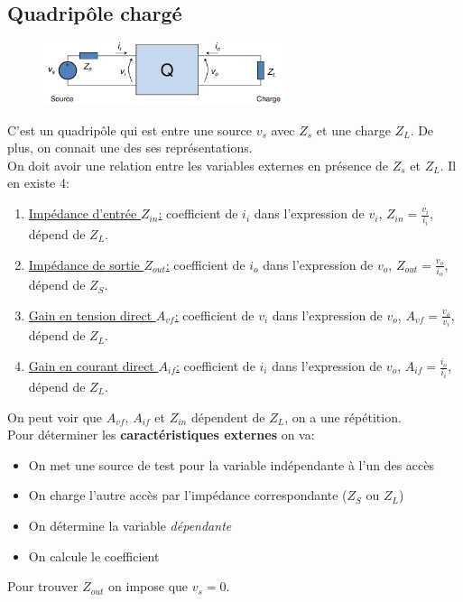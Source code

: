 \documentclass{report}
\begin{document}
\subsection{Quadripôle chargé}
\begin{figure}[H]
\centering
\includegraphics[width=7cm]{img/quadriCharge.png}
\end{figure}
C'est un quadripôle qui est entre une source $v_s$ avec $Z_s$ et une charge $Z_L$. De plus, on connait une des ses représentations.\\
On doit avoir une relation entre les variables externes en présence de $Z_s$ et $Z_L$. Il en existe 4:
\begin{enumerate}
\item \underline{Impédance d'entrée $Z_{in}$:} coefficient de $i_i$ dans l'expression de $v_i$, $Z_{in} = \frac{v_i}{i_i}$, dépend de $Z_L$.
\item \underline{Impédance de sortie $Z_{out}$:} coefficient de $i_o$ dans l'expression de $v_o$, $Z_{out} = \frac{v_o}{i_o}$, dépend de $Z_S$.
\item \underline{Gain en tension direct $A_{vf}$:} coefficient de $v_i$ dans l'expression de $v_o$, $A_{vf} = \frac{v_o}{v_i}$, dépend de $Z_L$.
\item \underline{Gain en courant direct $A_{if}$:} coefficient de $i_i$ dans l'expression de $v_o$, $A_{if} = \frac{i_o}{i_i}$, dépend de $Z_L$.
\end{enumerate}

On peut voir que $A_{vf}$, $A_{if}$ et $Z_{in}$ dépendent de $Z_L$, on a une répétition.\\
Pour déterminer les \textbf{caractéristiques externes} on va:
\begin{itemize}
\item On met une source de test pour la variable indépendante à l'un des accès
\item On charge l'autre accès par l'impédance correspondante ($Z_S$ ou $Z_L$)
\item On détermine la variable \textit{dépendante}
\item On calcule le coefficient
\end{itemize}
Pour trouver $Z_{out}$ on impose que $v_s = 0$.
\end{document}
